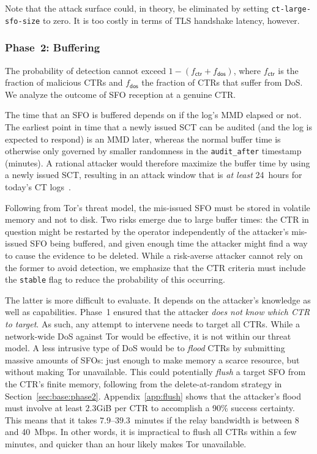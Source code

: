 Note that the attack surface could, in theory, be eliminated by setting
\texttt{ct-large-sfo-size} to zero.  It is too costly in terms of TLS handshake
latency, however.

\subsubsection{Phase~2: Buffering} \label{sec:analysis:pr:phase2}
The probability of detection cannot exceed $1-(f_{\mathsf{ctr}} +
f_{\mathsf{dos}})$, where $f_{\mathsf{ctr}}$ is the fraction of
malicious CTRs and $f_{\mathsf{dos}}$ the fraction of CTRs that suffer from
DoS.  We analyze the outcome of SFO reception at a genuine CTR.

The time that an SFO is buffered depends on if the log's MMD elapsed or not.
The earliest point in time that a newly issued SCT can be audited (and the log
is expected to respond) is an MMD later, whereas the normal buffer time is
otherwise only governed by smaller randomness in the \texttt{audit\_after}
timestamp (minutes).  A rational attacker would therefore maximize the buffer
time by using a newly issued SCT, resulting in an attack window that is \emph{at
least} 24~hours for today's CT logs~\cite{google-log-policy}.

Following from Tor's threat model, the mis-issued SFO must be stored in volatile
memory and not to disk.  Two risks emerge due to large buffer times:
	the CTR in question might be restarted by the operator independently of the
		attacker's mis-issued SFO being buffered,
	and given enough time the attacker might find a way to cause the evidence to
		be deleted.
While a risk-averse attacker cannot rely on the former to avoid detection, we
emphasize that the CTR criteria must include the \texttt{stable} flag to reduce
the probability of this occurring.

The latter is more difficult to evaluate.  It depends on the attacker's
knowledge as well as capabilities.  Phase~1 ensured that the attacker \emph{does
not know which CTR to target}.  As such, any attempt to intervene needs to
target all CTRs.  While a network-wide DoS against Tor would be effective, it is
not within our threat model.  A less intrusive type of DoS would be to
\emph{flood} CTRs by submitting massive amounts of SFOs:
	just enough to make memory a scarce resource, but
	without making Tor unavailable.
This could potentially \emph{flush} a target SFO from the CTR's finite memory,
following from the delete-at-random strategy in Section~\ref{sec:base:phase2}.
Appendix~\ref{app:flush} shows that the attacker's flood must involve at least
$2.3$GiB per CTR to accomplish a 90\% success certainty.  This means that it
takes $7.9$--$39.3$~minutes if the relay bandwidth is between 8 and 40~Mbps.
In other words, it is impractical to flush all CTRs within a few minutes, and
quicker than an hour likely makes Tor unavailable.

